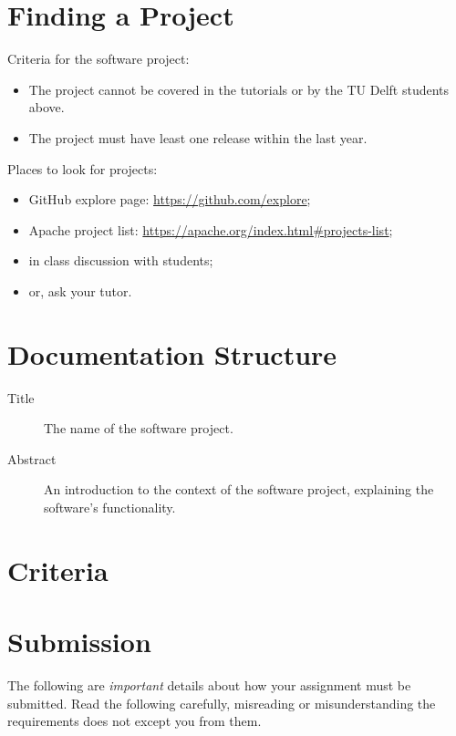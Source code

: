 \documentclass{csse4400}
\begin{document}
\section{Finding a Project}
Criteria for the software project:
\begin{itemize}
    \item The project cannot be covered in the tutorials or by the TU Delft students above.
    \item The project must have least one release within the last year.
\end{itemize}

\noindent Places to look for projects:
\begin{itemize}
    \item GitHub explore page: \url{https://github.com/explore};
    \item Apache project list: \url{https://apache.org/index.html#projects-list};
    \item in class discussion with students;
    \item or, ask your tutor.
\end{itemize}

\section{Documentation Structure}

\begin{description}
    \item[Title] The name of the software project.
    \item[Abstract] An introduction to the context of the software project, explaining the software's functionality.
\end{description}

\section{Criteria}

\section{Submission}
The following are \textsl{important} details about how your assignment must be submitted.
Read the following carefully, misreading or misunderstanding the requirements does not except you from them.
\end{document}
